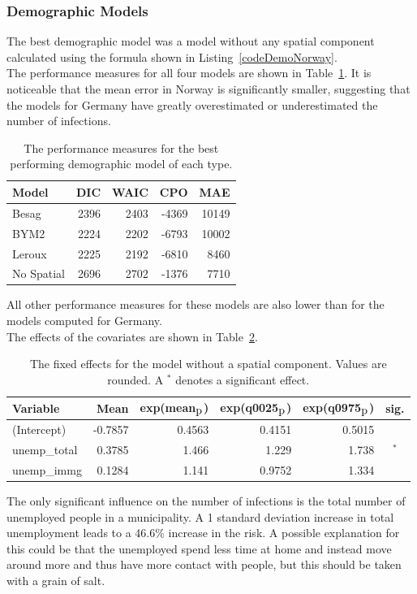 \subsubsection{Demographic Models}\label{sssec:demoNorway}
The best demographic model was a model without any spatial component calculated using the formula shown in Listing~\ref{codeDemoNorway}. \\
The performance measures for all four models are shown in Table~\ref{demoNorway}. It is noticeable that the mean error in Norway is significantly smaller, suggesting that the models for Germany have greatly overestimated or underestimated the number of infections.
\begin{table}[H] 
\caption{The performance measures for the best performing demographic model of each type. \label{demoNorway}}
\begin{tabular}{l r r r r}
\toprule
\textbf{Model}	& \textbf{DIC}	& \textbf{WAIC} & \textbf{CPO} & \textbf{MAE}\\
\midrule
Besag  & 2396 & 2403 & -4369 & 10149 \\
BYM2 & 2224 & 2202 & -6793 & 10002\\
Leroux & 2225  & 2192 & -6810 & 8460\\
No Spatial & 2696  & 2702 & -1376 & 7710\\
\bottomrule
\end{tabular}
\end{table}
All other performance measures for these models are also lower than for the models computed for Germany. \\
The effects of the covariates are shown in Table~\ref{fixedDemoNorway}.
\begin{table}[H] 
\caption{The fixed effects for the model without a spatial component. Values are rounded. A $^*$ denotes a significant effect.\label{fixedDemoNorway}}
\begin{tabular}{l r r r r c}
\toprule
\textbf{Variable}	& \textbf{Mean}	& \textbf{exp(mean$_{\hbox{p}}$)} & \textbf{exp(q0025$_{\hbox{p}}$)} & \textbf{exp(q0975$_{\hbox{p}}$)} & \textbf{sig.}\\
\midrule
(Intercept) & -0.7857 & 0.4563 & 0.4151 & 0.5015 & \\
unemp\_total & 0.3785 & 1.466 & 1.229 & 1.738 & $^*$\\
unemp\_immg & 0.1284 & 1.141 & 0.9752 & 1.334 & \\
\bottomrule
\end{tabular}
\end{table}
The only significant influence on the number of infections is the total number of unemployed people in a municipality. A 1 standard deviation increase in total unemployment leads to a 46.6\% increase in the risk. A possible explanation for this could be that the unemployed spend less time at home and instead move around more and thus have more contact with people, but this should be taken with a grain of salt.
